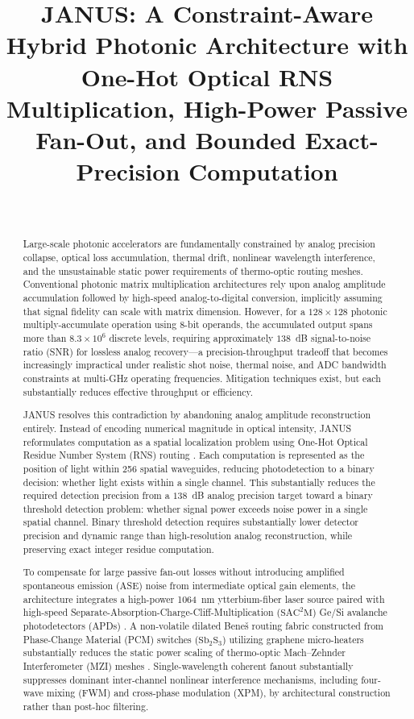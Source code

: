 \documentclass[journal]{IEEEtran}
\title{
JANUS: A Constraint-Aware Hybrid Photonic Architecture with One-Hot Optical RNS Multiplication, High-Power Passive Fan-Out, and Bounded Exact-Precision Computation
}
\author{
\IEEEauthorblockN{Deepanshu Bhardwaj}\\[2pt]
\IEEEauthorblockA{\small Patent Application No.: 202611052791 (Patent Pending)}
}
\begin{document}
\maketitle

\begin{abstract}

Large-scale photonic accelerators are fundamentally constrained by analog precision collapse, optical loss accumulation, thermal drift, nonlinear wavelength interference, and the unsustainable static power requirements of thermo-optic routing meshes. Conventional photonic matrix multiplication architectures rely upon analog amplitude accumulation followed by high-speed analog-to-digital conversion, implicitly assuming that signal fidelity can scale with matrix dimension. However, for a $128 \times 128$ photonic multiply-accumulate operation using 8-bit operands, the accumulated output spans more than $8.3 \times 10^{6}$ discrete levels, requiring approximately $138$~dB signal-to-noise ratio (SNR) for lossless analog recovery---a precision-throughput tradeoff that becomes increasingly impractical under realistic shot noise, thermal noise, and ADC bandwidth constraints at multi-GHz operating frequencies. Mitigation techniques exist, but each substantially reduces effective throughput or efficiency. 

JANUS resolves this contradiction by abandoning analog amplitude reconstruction entirely. Instead of encoding numerical magnitude in optical intensity, JANUS reformulates computation as a spatial localization problem using One-Hot Optical Residue Number System (RNS) routing \cite{Omosanya2021}\cite{Huang1979}\cite{Sorger2018}. Each computation is represented as the position of light within 256 spatial waveguides, reducing photodetection to a binary decision: whether light exists within a single channel. This substantially reduces the required detection precision from a $138$~dB analog precision target toward a binary threshold detection problem: whether signal power exceeds noise power in a single spatial channel. Binary threshold detection requires substantially lower detector precision and dynamic range than high-resolution analog reconstruction, while preserving exact integer residue computation.

To compensate for large passive fan-out losses without introducing amplified spontaneous emission (ASE) noise from intermediate optical gain elements, the architecture integrates a high-power \SI{1064}{\nano\meter} ytterbium-fiber laser source paired with high-speed Separate-Absorption-Charge-Cliff-Multiplication ($\mathrm{SAC^2M}$) Ge/Si avalanche photodetectors (APDs) \cite{Jeong2004}\cite{Chen2025}. A non-volatile dilated Bene\v{s} routing fabric constructed from Phase-Change Material (PCM) switches ($\mathrm{Sb_2S_3}$) utilizing graphene micro-heaters substantially reduces the static power scaling of thermo-optic Mach--Zehnder Interferometer (MZI) meshes \cite{Wuttig2017}\cite{Delaney2020}\cite{Rios2021}. Single-wavelength coherent fanout substantially suppresses dominant inter-channel nonlinear interference mechanisms, including four-wave mixing (FWM) and cross-phase modulation (XPM), by architectural construction rather than post-hoc filtering.


\end{abstract}
\end{document}
